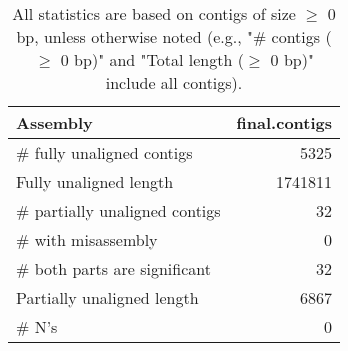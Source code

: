 \documentclass[12pt,a4paper]{article}
\begin{document}
\begin{table}[ht]
\begin{center}
\caption{All statistics are based on contigs of size $\geq$ 0 bp, unless otherwise noted (e.g., "\# contigs ($\geq$ 0 bp)" and "Total length ($\geq$ 0 bp)" include all contigs).}
\begin{tabular}{|l*{1}{|r}|}
\hline
Assembly & final.contigs \\ \hline
\# fully unaligned contigs & 5325 \\ \hline
Fully unaligned length & 1741811 \\ \hline
\# partially unaligned contigs & 32 \\ \hline
\hspace{5mm}\# with misassembly & 0 \\ \hline
\hspace{5mm}\# both parts are significant & 32 \\ \hline
Partially unaligned length & 6867 \\ \hline
\# N's & 0 \\ \hline
\end{tabular}
\end{center}
\end{table}
\end{document}
